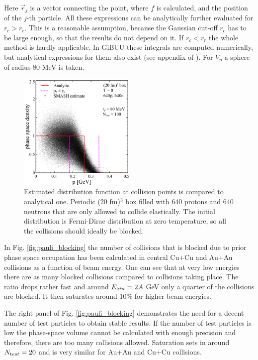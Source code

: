 Here $\vec{r}_j$ is a vector connecting the point, where $f$ is calculated, and
the position of the $j$-th particle. All these expressions can be analytically
further evaluated for $r_c>r_r$. This is a reasonable assumption, because the
Gaussian cut-off $r_c$ has to be large enough, so that the results do not
depend on it. If $r_c<r_r$ the whole method is hardly applicable. In GiBUU
these integrals are computed numerically, but analytical expressions for them
also exist (see appendix of \cite{Weil:2016zrk}). For $V_p$ a sphere of radius 80 MeV
is taken.

\begin{figure}
  \centering
  \includegraphics[width=0.5\textwidth]{plots/smash/SMASH_testsetup_ntest100_rp80.png}
  \caption{Estimated distribution function at collision points is compared to
           analytical one. Periodic (20 fm)$^3$ box filled with 640 protons
           and 640 neutrons that are only allowed to collide elastically.
           The initial distribution is Fermi-Dirac distribution at zero temperature,
           so all the collisions should ideally be blocked.}
  \label{fig:f_estimate}
\end{figure}

In Fig. \ref{fig:pauli_blocking} the number of collisions that is blocked due
to prior phase space occupation has been calculated in central Cu+Cu and Au+Au
collisions as a function of beam energy. One can see that at very low energies
there are as many blocked collisions compared to collisions taking place. The ratio
drops rather fast and around $E_{\textrm kin} = 2A$ GeV only a quarter of the
collisions are blocked. It then saturates around 10\% for higher beam energies.

The right panel of Fig. \ref{fig:pauli_blocking} demonstrates the need for a
decent number of test particles to obtain stable results. If the number of test
particles is low the phase-space volume cannot be calculated with enough
precision and therefore, there are too many collisions allowed. Saturation sets
in around $N_{\textrm test} =20$ and is very similar for Au+Au and Cu+Cu
collisions.

